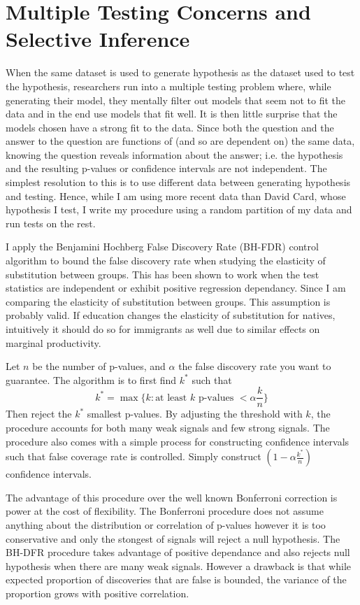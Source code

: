 \documentclass[11pt]{article}
\theoremstyle{definition}
\theoremstyle{remark}
\def\a{\alpha}
\begin{document}
\section{Multiple Testing Concerns and Selective Inference}

When the same dataset is used to generate hypothesis as the dataset used to
test the hypothesis, researchers run into a multiple testing problem where, while
generating their model, they  mentally filter out models that seem not to fit the
data and in the end use models that fit well. It is then little surprise that the
models chosen have a strong fit to the data. Since both the question and the
answer to the question are functions of (and so are dependent on) the same data,
knowing the question reveals information about the answer; i.e. the hypothesis
and the resulting p-values or confidence intervals are not independent. The
simplest resolution to this is to use different data between generating hypothesis
and testing. Hence, while I am using more recent data than David
Card, whose hypothesis I test, I write my procedure using a random partition of
my data and run tests on the rest.

I apply the Benjamini Hochberg False Discovery Rate (BH-FDR) control
algorithm to bound the false discovery rate when studying the elasticity of
substitution between groups. This has been shown  to work when the
test statistics are independent or exhibit positive regression dependancy. Since
I am comparing the elasticity of substitution between groups. This assumption
is probably valid. If education changes the elasticity of substitution for
natives, intuitively it should do so for immigrants as well due to similar
effects on marginal productivity.

Let $n$ be the number of p-values, and $\a$ the false discovery rate
you want to guarantee. The algorithm is to first find $k^*$ such that
$$k^* = \max\{k :\text{at least }k\text{ p-values } < \a\frac kn\}$$
Then reject the $k^*$ smallest p-values. By adjusting the threshold
with $k$, the procedure accounts for both many weak signals and few strong
signals. The procedure also comes with a simple process for constructing confidence
intervals such that false coverage rate is controlled. Simply construct
$(1-\a\frac{k^*}n)$ confidence intervals.

The advantage of this procedure over the well known Bonferroni correction is
power at the cost of flexibility. The Bonferroni procedure does not assume anything
about the distribution or correlation of p-values however it is too conservative
and only the stongest of signals will reject a null hypothesis. The BH-DFR
procedure takes advantage of positive dependance and also rejects null hypothesis
when there are many weak signals. However a drawback is that while
expected proportion of discoveries that are false is bounded, the variance of
the proportion grows with positive correlation.
\end{document}
